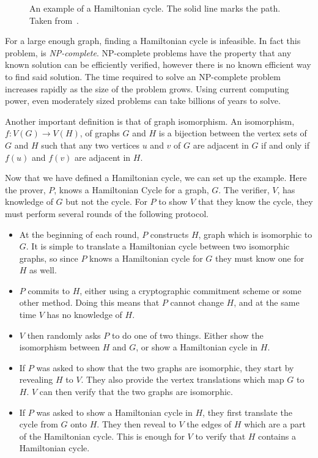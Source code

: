 \documentclass{sig-alternate}
\begin{document}
	\begin{figure}
	\centering
	\caption{An example of a Hamiltonian cycle. The solid line marks the path.
	Taken from~\cite{Wiki:Hamiltonian}.}
	\label{fig:HCycle}
	\end{figure}
	
	For a large enough
	graph, finding a Hamiltonian cycle is infeasible. In fact this problem, 
	is \textit{NP-complete}. NP-complete problems have the property that
	any known solution can be efficiently verified, however there is no known
	efficient way to find said solution. The time required to solve an 
	NP-complete problem increases rapidly as the size of the problem grows.
	Using current computing power, even moderately sized problems can take 
	billions of years to solve.
	
	Another important definition is that of graph isomorphism. An
	isomorphism, $f:V(G) \rightarrow V(H)$, of graphs $G$ and $H$ is a 
	bijection between the vertex
	sets of $G$ and $H$ such that any two vertices $u$ and $v$ of $G$ are
	adjacent in $G$ if and only if $f(u)$ and $f(v)$ are adjacent in $H$.
		
	Now that we have defined a Hamiltonian cycle, we can set up the example.
	Here the prover, $P$, knows a Hamiltonian Cycle for a graph, $G$. The
	verifier, $V$, has knowledge of $G$ but not the cycle. For $P$ to show
	$V$ that they know the cycle, they must perform several rounds of the 
	following protocol.
	
	\begin{itemize}
		\item At the beginning of each round, $P$ constructs $H$, graph which
		is isomorphic to $G$. It is simple to translate a Hamiltonian cycle
		between two isomorphic graphs, so since $P$ knows a Hamiltonian cycle
		for $G$ they must know one for $H$ as well.
		
		\item $P$ commits to $H$, either using a cryptographic commitment
		scheme or some other method. Doing this means that $P$ cannot change
		$H$, and at the same time $V$ has no knowledge of $H$.
		
		\item $V$ then randomly asks $P$ to do one of two things. Either show
		the isomorphism between $H$ and $G$, or show a Hamiltonian cycle in $H$.
		
		\item If $P$ was asked to show that the two graphs are isomorphic, they
		start by revealing $H$ to $V$. They also provide the vertex translations
		which map $G$ to $H$. $V$ can then verify that the two graphs are isomorphic.
		
		\item If $P$ was asked to show a Hamiltonian cycle in $H$, they first 
		translate the cycle from $G$ onto $H$. They then reveal to $V$ the 
		edges of $H$ which are a part of the Hamiltonian cycle. This is
		enough for $V$ to verify that $H$ contains a Hamiltonian cycle.
	\end{itemize}
	
\end{document}
